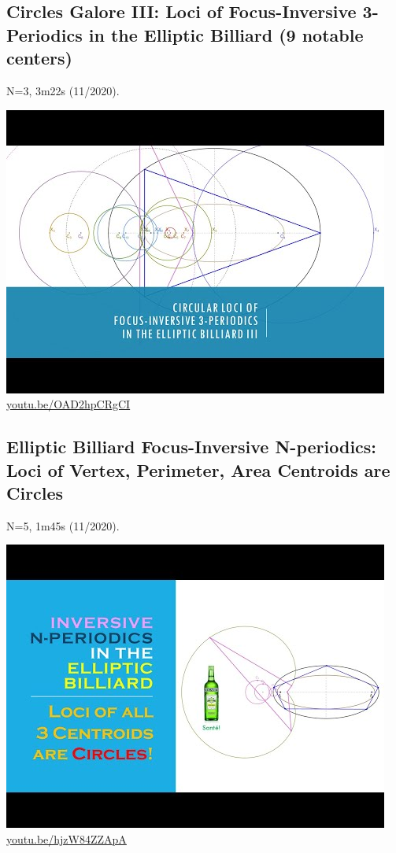 \documentclass[12pt]{amsart}
\begin{document}
\subsection{Circles Galore III: Loci of Focus-Inversive 3-Periodics in the Elliptic Billiard (9 notable centers)}
\label{vid:OAD2hpCRgCI}
\noindent N=3, 3m22s (11/2020). 
\begin{center}\includegraphics[width=.5\textwidth]{pics/OAD2hpCRgCI.jpg} \\ 
\href{https://youtu.be/OAD2hpCRgCI}{\url{youtu.be/OAD2hpCRgCI}}\end{center}
% 

\subsection{Elliptic Billiard Focus-Inversive N-periodics: Loci of Vertex, Perimeter, Area Centroids are Circles}
\label{vid:hjzW84ZZApA}
\noindent N=5, 1m45s (11/2020). 
\begin{center}\includegraphics[width=.5\textwidth]{pics/hjzW84ZZApA.jpg} \\ 
\href{https://youtu.be/hjzW84ZZApA}{\url{youtu.be/hjzW84ZZApA}}\end{center}
% 
\end{document}
